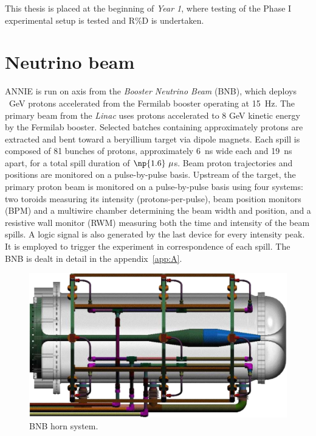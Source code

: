 This thesis is placed at the beginning of \emph{Year 1}, where testing of the Phase I %
experimental setup is tested and R\%D is undertaken.

\section{Neutrino beam}

ANNIE is run on axis from the \emph{Booster Neutrino Beam} (BNB), which deploys %
~GeV protons accelerated from the Fermilab booster operating at 15~Hz.
The primary beam from the \emph{Linac} uses protons accelerated to 8 GeV kinetic energy %
by the Fermilab booster. 
Selected batches containing approximately  protons are extracted %
and bent toward a beryillium target via dipole magnets.
Each spill is composed of 81 bunches of protons, approximately 6~ns wide each %
and 19~ns apart, for a total spill duration of $\np{1.6}~\mu$s.
Beam proton trajectories and positions are monitored on a pulse-by-pulse basis.
Upstream of the target, the primary proton beam is monitored on a pulse-by-pulse basis %
using four systems: %
two toroids measuring its intensity (protons-per-pulse), beam position monitors %
(BPM) and a multiwire chamber determining the beam width and position, %
and a resistive wall monitor (RWM) measuring both the time and intensity of the beam spills.
A logic signal is also generated by the last device for every intensity peak.
It is employed to trigger the experiment in correspondence of each spill.
The BNB is dealt in detail in the appendix~\ref{app:A}.

\begin{figure}
  \centering
  \includegraphics[scale=.2]{pics/bnbhorn}
  \caption{BNB horn system.}
  \label{fig:bnbhorn}
\end{figure}

